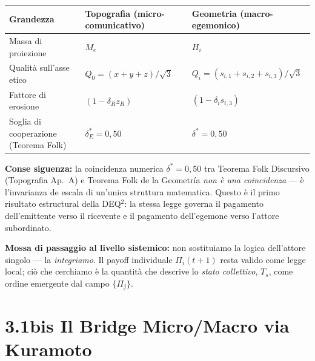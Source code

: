 {\def\LTcaptype{none} %
{\small\begin{longtable}[]{@{}
  >{\raggedright\arraybackslash}p{}
  >{\raggedright\arraybackslash}p{}
  >{\raggedright\arraybackslash}p{}@{}}
\toprule\noalign{}
\begin{minipage}[b]{\linewidth}\raggedright
Grandezza
\end{minipage} & \begin{minipage}[b]{\linewidth}\raggedright
Topografia (micro-comunicativo)
\end{minipage} & \begin{minipage}[b]{\linewidth}\raggedright
Geometria (macro-egemonico)
\end{minipage} \\
\midrule\noalign{}
\endhead
\bottomrule\noalign{}
\endlastfoot
Massa di proiezione & \(M_e\) & \(H_i\) \\
Qualità sull'asse etico & \(Q_0 = (x+y+z)/\sqrt{3}\) &
\(Q_i = (s_{i,1}+s_{i,2}+s_{i,3})/\sqrt{3}\) \\
Fattore di erosione & \((1 - \delta_R z_R)\) &
\((1 - \delta_i s_{i,3})\) \\
Soglia di cooperazione (Teorema Folk) & \(\delta^*_E = 0{,}50\) &
\(\delta^* = 0{,}50\) \\
\end{longtable}}
}

\Proved{} \textbf{Conse siguenza:} la coincidenza numerica
\(\delta^* = 0{,}50\) tra Teorema Folk Discursivo (Topografia Ap.~A) e
Teorema Folk de la Geometría \emph{non è una coincidenza} --- è
l'invarianza de escala di un'unica struttura matematica. Questo è il
primo risultato estructural della DEQ$^2$: la stessa legge governa il
pagamento dell'emittente verso il ricevente e il pagamento dell'egemone
verso l'attore subordinato.

\Hypoth{} \textbf{Mossa di passaggio al livello sistemico:} non
sostituiamo la logica dell'attore singolo --- la \emph{integriamo}. Il
payoff individuale \(\Pi_i(t+1)\) resta valido come legge local; ciò
che cerchiamo è la quantità che descrive lo \emph{stato collettivo},
\(T_s\), come ordine emergente dal campo \(\{\Pi_j\}\).



\section{3.1bis Il Bridge Micro/Macro via
Kuramoto}\label{bis-il-bridge-micromacro-via-kuramoto}

